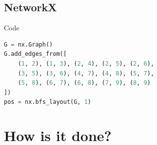 \documentclass[11pt]{beamer}
\begin{document}
\subsection{NetworkX}
\begin{frame}{\subsecname}
\begin{figure}
\resizebox{0.8\textwidth}{!}{}
\end{figure}
\end{frame}

\begin{frame}[fragile]{\subsecname}{Code}
    \begin{block}{}
        \begin{lstlisting}[language=python]
G = nx.Graph()
G.add_edges_from([
    (1, 2), (1, 3), (2, 4), (2, 5), (2, 6),
    (3, 5), (3, 6), (4, 7), (4, 8), (5, 7),
    (5, 8), (6, 7), (6, 8), (7, 9), (8, 9)
])
pos = nx.bfs_layout(G, 1)
        \end{lstlisting}
    \end{block}
\end{frame}

\section{How is it done?}
\begin{frame}{\secname}
    \tableofcontents[currentsection,hideothersubsections,sectionstyle=hide]
\end{frame}
\end{document}
